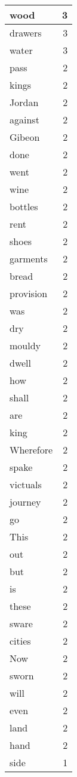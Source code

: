 \begin{center}
\begin{longtable}{l|r}
wood & 3\\ \hline 
drawers & 3\\ \hline 
water & 3\\ \hline 
pass & 2\\ \hline 
kings & 2\\ \hline 
Jordan & 2\\ \hline 
against & 2\\ \hline 
Gibeon & 2\\ \hline 
done & 2\\ \hline 
went & 2\\ \hline 
wine & 2\\ \hline 
bottles & 2\\ \hline 
rent & 2\\ \hline 
shoes & 2\\ \hline 
garments & 2\\ \hline 
bread & 2\\ \hline 
provision & 2\\ \hline 
was & 2\\ \hline 
dry & 2\\ \hline 
mouldy & 2\\ \hline 
dwell & 2\\ \hline 
how & 2\\ \hline 
shall & 2\\ \hline 
are & 2\\ \hline 
king & 2\\ \hline 
Wherefore & 2\\ \hline 
spake & 2\\ \hline 
victuals & 2\\ \hline 
journey & 2\\ \hline 
go & 2\\ \hline 
This & 2\\ \hline 
out & 2\\ \hline 
but & 2\\ \hline 
is & 2\\ \hline 
these & 2\\ \hline 
sware & 2\\ \hline 
cities & 2\\ \hline 
Now & 2\\ \hline 
sworn & 2\\ \hline 
will & 2\\ \hline 
even & 2\\ \hline 
land & 2\\ \hline 
hand & 2\\ \hline 
side & 1\\ \hline 

\end{longtable}
\end{center}

